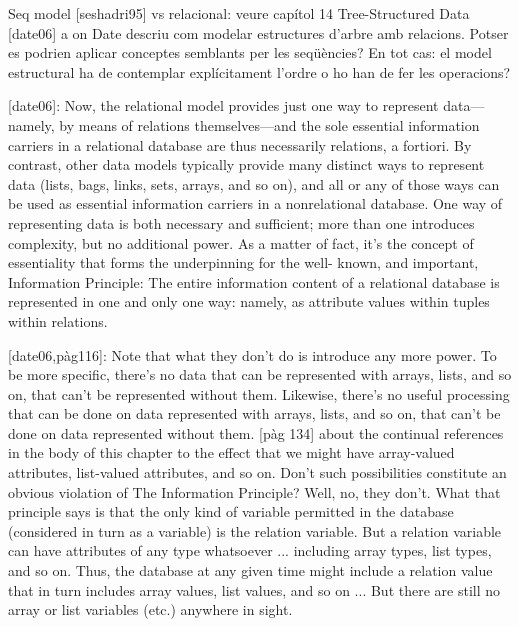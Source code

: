 Seq model [seshadri95] vs relacional: veure capítol 14 Tree-Structured Data [date06] a on Date descriu com modelar estructures d'arbre amb relacions. Potser es podrien aplicar conceptes semblants per les seqüències? En tot cas: el model estructural ha de contemplar explícitament l'ordre o ho han de fer les operacions?

[date06]:
                                                Now, the relational model provides just one way to
represent data—namely, by means of relations themselves—and the sole essential information
carriers in a relational database are thus necessarily relations, a fortiori. By contrast, other data
models typically provide many distinct ways to represent data (lists, bags, links, sets, arrays,
and so on), and all or any of those ways can be used as essential information carriers in a
nonrelational database. One way of representing data is both necessary and sufficient; more
than one introduces complexity, but no additional power.
     As a matter of fact, it’s the concept of essentiality that forms the underpinning for the well-
known, and important, Information Principle:
     The entire information content of a relational database is represented in one and only
     one way: namely, as attribute values within tuples within relations.

[date06,pàg116]:
Note that what they don’t do is introduce any more power. To be more specific, there’s no data that can
be represented with arrays, lists, and so on, that can’t be represented without them. Likewise, there’s no
useful processing that can be done on data represented with arrays, lists, and so on, that can’t be done
on data represented without them.
[pàg 134]
about the continual references in the body of this chapter to the effect that we might have
array-valued attributes, list-valued attributes, and so on. Don’t such possibilities constitute an
obvious violation of The Information Principle?
     Well, no, they don’t. What that principle says is that the only kind of variable permitted in
the database (considered in turn as a variable) is the relation variable. But a relation variable
can have attributes of any type whatsoever ... including array types, list types, and so on.
Thus, the database at any given time might include a relation value that in turn includes array
values, list values, and so on ... But there are still no array or list variables (etc.) anywhere in sight.









